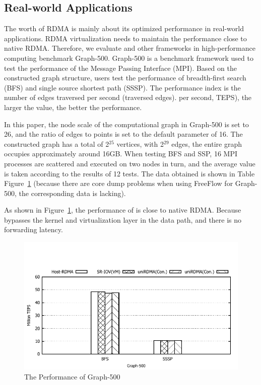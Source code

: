 \subsection{Real-world Applications}

The worth of RDMA is mainly about its optimized performance in real-world applications. RDMA virtualization needs to maintain the performance close to native RDMA. Therefore, we evaluate \sys and other frameworks in high-performance computing benchmark Graph-500. Graph-500 is a benchmark framework used to test the performance of the Message Passing Interface (MPI). Based on the constructed graph structure, users test the performance of breadth-first search (BFS) and single source shortest path (SSSP). The performance index is the number of edges traversed per second (traversed edges). per second, TEPS), the larger the value, the better the performance.

In this paper, the node scale of the computational graph in Graph-500 is set to 26, and the ratio of edges to points is set to the default parameter of 16. The constructed graph has a total of 2$^{25}$ vertices, with 2$^{29}$ edges, the entire graph occupies approximately around 16GB. When testing BFS and SSP, 16 MPI processes are scattered and executed on two nodes in turn, and the average value is taken according to the results of 12 tests. The data obtained is shown in Table Figure~\ref{fig:graph-500} (because there are core dump problems when using FreeFlow for Graph-500, the corresponding data is lacking).

As shown in Figure~\ref{fig:graph-500},  the performance of \sys is close to native RDMA. Because \sys bypasses the kernel and virtualization layer in the data path, and there is no forwarding latency.

\begin{figure}[!ht]
	\centering
	\includegraphics[width=1.0\linewidth]{images/graph-500.pdf}
	\caption{The Performance of Graph-500}
	\label{fig:graph-500}
\end{figure}